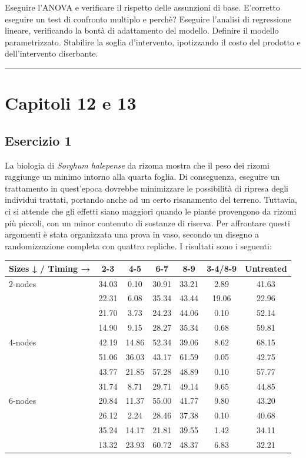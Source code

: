 \documentclass[a4paper,12pt,oneside]{book}
\begin{document}
Eseguire l'ANOVA e verificare il rispetto delle assunzioni di base. E'corretto eseguire un test di confronto multiplo e perchè? Eseguire l'analisi di regressione lineare, verificando la bontà di adattamento del modello. Definire il modello parametrizzato. Stabilire la soglia d'intervento, ipotizzando il costo del prodotto e dell'intervento diserbante.

\begin{center}\rule{0.5\linewidth}{0.5pt}\end{center}

\hypertarget{capitoli-12-e-13}{%
\section{Capitoli 12 e 13}\label{capitoli-12-e-13}}

\hypertarget{esercizio-1-8}{%
\subsection{Esercizio 1}\label{esercizio-1-8}}

La biologia di \emph{Sorghum halepense} da rizoma mostra che il peso dei rizomi raggiunge un minimo intorno alla quarta foglia. Di conseguenza, eseguire un trattamento in quest'epoca dovrebbe minimizzare le possibilità di ripresa degli individui trattati, portando anche ad un certo risanamento del terreno. Tuttavia, ci si attende che gli effetti siano maggiori quando le piante provengono da rizomi più piccoli, con un minor contenuto di sostanze di riserva. Per affrontare questi argomenti è stata organizzata una prova in vaso, secondo un disegno a randomizzazione completa con quattro repliche. I risultati sono i seguenti:

\begin{longtable}[]{@{}lcccccc@{}}
\toprule
Sizes ↓ / Timing → & 2-3 & 4-5 & 6-7 & 8-9 & 3-4/8-9 & Untreated \\
\midrule
\endhead
2-nodes & 34.03 & 0.10 & 30.91 & 33.21 & 2.89 & 41.63 \\
& 22.31 & 6.08 & 35.34 & 43.44 & 19.06 & 22.96 \\
& 21.70 & 3.73 & 24.23 & 44.06 & 0.10 & 52.14 \\
& 14.90 & 9.15 & 28.27 & 35.34 & 0.68 & 59.81 \\
4-nodes & 42.19 & 14.86 & 52.34 & 39.06 & 8.62 & 68.15 \\
& 51.06 & 36.03 & 43.17 & 61.59 & 0.05 & 42.75 \\
& 43.77 & 21.85 & 57.28 & 48.89 & 0.10 & 57.77 \\
& 31.74 & 8.71 & 29.71 & 49.14 & 9.65 & 44.85 \\
6-nodes & 20.84 & 11.37 & 55.00 & 41.77 & 9.80 & 43.20 \\
& 26.12 & 2.24 & 28.46 & 37.38 & 0.10 & 40.68 \\
& 35.24 & 14.17 & 21.81 & 39.55 & 1.42 & 34.11 \\
& 13.32 & 23.93 & 60.72 & 48.37 & 6.83 & 32.21 \\
\bottomrule
\end{longtable}
\end{document}
